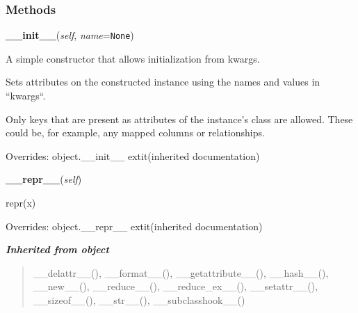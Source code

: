 
  \subsubsection{Methods}

    \vspace{0.5ex}

\hspace{.8\funcindent}\begin{boxedminipage}{\funcwidth}

    \raggedright \textbf{\_\_init\_\_}(\textit{self}, \textit{name}={\tt None})

\setlength{\parskip}{2ex}
    A simple constructor that allows initialization from kwargs.

    Sets attributes on the constructed instance using the names and values 
    in ``kwargs``.

    Only keys that are present as attributes of the instance's class are 
    allowed. These could be, for example, any mapped columns or 
    relationships.

\setlength{\parskip}{1ex}
      Overrides: object.\_\_init\_\_ 	extit{(inherited documentation)}

    \end{boxedminipage}

    \vspace{0.5ex}

\hspace{.8\funcindent}\begin{boxedminipage}{\funcwidth}

    \raggedright \textbf{\_\_repr\_\_}(\textit{self})

\setlength{\parskip}{2ex}
    repr(x)

\setlength{\parskip}{1ex}
      Overrides: object.\_\_repr\_\_ 	extit{(inherited documentation)}

    \end{boxedminipage}


\large{\textbf{\textit{Inherited from object}}}

\begin{quote}
\_\_delattr\_\_(), \_\_format\_\_(), \_\_getattribute\_\_(), \_\_hash\_\_(), \_\_new\_\_(), \_\_reduce\_\_(), \_\_reduce\_ex\_\_(), \_\_setattr\_\_(), \_\_sizeof\_\_(), \_\_str\_\_(), \_\_subclasshook\_\_()
\end{quote}

